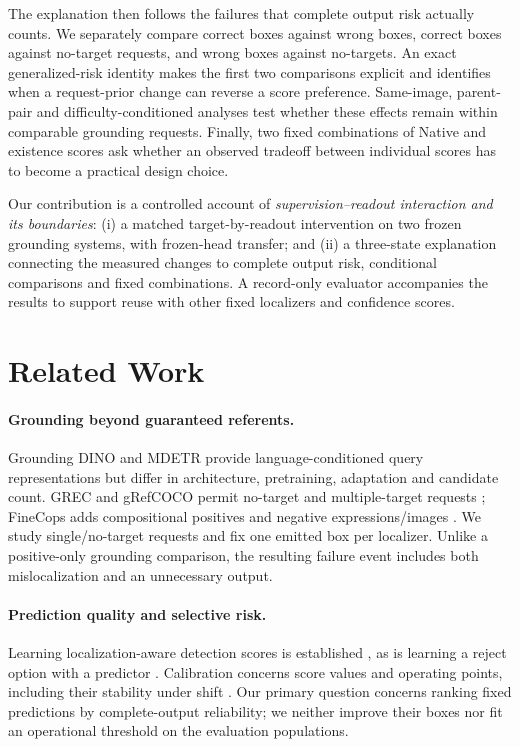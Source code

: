 \documentclass[10pt,twocolumn,letterpaper]{article}
\begin{document}
The explanation then follows the failures that complete output risk
actually counts. We separately compare correct boxes against wrong boxes,
correct boxes against no-target requests, and wrong boxes against no-targets.
An exact generalized-risk identity makes the first two comparisons explicit
and identifies when a request-prior change can reverse a score preference.
Same-image, parent-pair and difficulty-conditioned analyses test whether
these effects remain within comparable grounding requests. Finally, two
fixed combinations of Native and existence scores ask whether an observed
tradeoff between individual scores has to become a practical design choice.

Our contribution is a controlled account of \emph{supervision--readout
interaction and its boundaries}: (i) a matched target-by-readout
intervention on two frozen grounding systems, with frozen-head transfer;
and (ii) a three-state explanation connecting the measured changes to
complete output risk, conditional comparisons and fixed combinations.
A record-only evaluator accompanies the results to support reuse with
other fixed localizers and confidence scores.

\section{Related Work}
\paragraph{Grounding beyond guaranteed referents.}
Grounding DINO \cite{liu2025groundingdino} and MDETR \cite{kamath2021mdetr}
provide language-conditioned query representations but differ in
architecture, pretraining, adaptation and candidate count.
GREC and gRefCOCO permit no-target and multiple-target requests
\cite{he2023grec,liu2023gres}; FineCops adds compositional positives and
negative expressions/images \cite{liu2024finecops}. We study single/no-target
requests and fix one emitted box per localizer. Unlike a positive-only
grounding comparison, the resulting failure event includes both
mislocalization and an unnecessary output.

\paragraph{Prediction quality and selective risk.}
Learning localization-aware detection scores is established
\cite{li2020gfl}, as is learning a reject option with a predictor
\cite{geifman2019selectivenet}. Calibration concerns score values and
operating points, including their stability under shift
\cite{guo2017calibration,ovadia2019trust}. Our primary question concerns
ranking fixed predictions by complete-output reliability; we neither
improve their boxes nor fit an operational threshold on the evaluation
populations.
\end{document}

